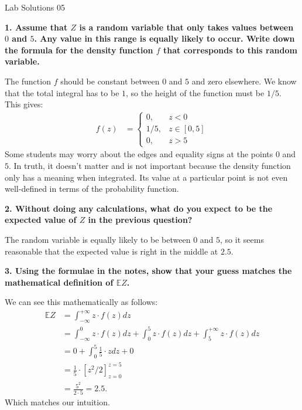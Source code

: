 \documentclass[12pt,hidelinks]{article}
\numberwithin{equation}{section}
\begin{document}
{\LARGE Lab Solutions 05}

\vspace*{12pt}

\textbf{1. Assume that $Z$ is a random variable that only takes values between $0$
and $5$. Any value in this range is equally likely to occur. Write down the
formula for the density function $f$ that corresponds to this random variable.}

\vspace*{12pt}

The function $f$ should be constant between $0$ and $5$ and zero elsewhere. We
know that the total integral has to be $1$, so the height of the function must
be $1/5$. This gives:
\begin{align}
f(z) &= \begin{cases} 0, & z < 0 \\ 1/5, & z \in [0, 5] \\ 0, & z > 5 \end{cases}
\end{align}
Some students may worry about the edges and equality signs at the points $0$
and $5$. In truth, it doesn't matter and is not important because the density
function only has a meaning when integrated. Its value at a particular point
is not even well-defined in terms of the probability function.

\vspace*{12pt}


\textbf{2. Without doing any calculations, what do you expect to be the expected
value of $Z$ in the previous question?}

\vspace*{12pt}

The random variable is equally likely to be between $0$ and $5$, so it seems
reasonable that the expected value is right in the middle at $2.5$.

\vspace*{12pt}



\textbf{3. Using the formulae in the notes, show that your guess matches the mathematical
definition of $\mathbb{E}Z$.}

\vspace*{12pt}

We can see this mathematically as follows:
\begin{align}
\mathbb{E} Z &= \int_{-\infty}^{+\infty} z \cdot f(z) dz \\
&= \int_{-\infty}^{0} z \cdot f(z) dz + \int_{0}^{5} z \cdot f(z)dz +
\int_{5}^{+\infty} z \cdot f(z)dz \\
&= 0 + \int_{0}^{5} \frac{1}{5} \cdot zdz + 0 \\
&= \frac{1}{5} \cdot \left[z^2 / 2 \right]_{z=0}^{z=5} \\
&= \frac{5^2}{2 \cdot 5} = 2.5.
\end{align}
Which matches our intuition.
\end{document}
